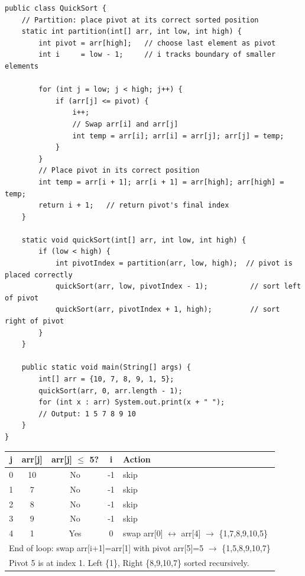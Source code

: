 \documentclass[12pt,a4paper,oneside]{book}
\begin{document}
\begin{lstlisting}[caption={Quick Sort --- in-place, average O(n log n)}]
public class QuickSort {
    // Partition: place pivot at its correct sorted position
    static int partition(int[] arr, int low, int high) {
        int pivot = arr[high];   // choose last element as pivot
        int i     = low - 1;     // i tracks boundary of smaller elements

        for (int j = low; j < high; j++) {
            if (arr[j] <= pivot) {
                i++;
                // Swap arr[i] and arr[j]
                int temp = arr[i]; arr[i] = arr[j]; arr[j] = temp;
            }
        }
        // Place pivot in its correct position
        int temp = arr[i + 1]; arr[i + 1] = arr[high]; arr[high] = temp;
        return i + 1;   // return pivot's final index
    }

    static void quickSort(int[] arr, int low, int high) {
        if (low < high) {
            int pivotIndex = partition(arr, low, high);  // pivot is placed correctly
            quickSort(arr, low, pivotIndex - 1);          // sort left of pivot
            quickSort(arr, pivotIndex + 1, high);         // sort right of pivot
        }
    }

    public static void main(String[] args) {
        int[] arr = {10, 7, 8, 9, 1, 5};
        quickSort(arr, 0, arr.length - 1);
        for (int x : arr) System.out.print(x + " ");
        // Output: 1 5 7 8 9 10
    }
}
\end{lstlisting}

\begin{dryrun}[Dry Run: Partition on \{10, 7, 8, 9, 1, 5\}, pivot = 5]
\begin{center}
\begin{tabular}{ccccl}
\toprule
\textbf{j} & \textbf{arr[j]} & \textbf{arr[j] $\leq$ 5?} & \textbf{i} & \textbf{Action}\\
\midrule
0 & 10 & No  & -1 & skip\\
1 & 7  & No  & -1 & skip\\
2 & 8  & No  & -1 & skip\\
3 & 9  & No  & -1 & skip\\
4 & 1  & Yes & 0  & swap arr[0] $\leftrightarrow$ arr[4] $\to$ \{1,7,8,9,10,5\}\\
\multicolumn{5}{l}{End of loop: swap arr[i+1]=arr[1] with pivot arr[5]=5 $\to$ \{1,5,8,9,10,7\}}\\
\multicolumn{5}{l}{Pivot 5 is at index 1. Left \{1\}, Right \{8,9,10,7\} sorted recursively.}\\
\bottomrule
\end{tabular}
\end{center}
\end{dryrun}
\end{document}
